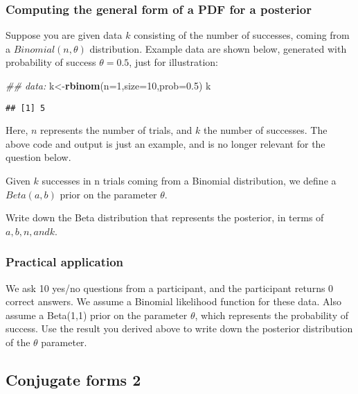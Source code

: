 \documentclass[12pt,]{krantz}
\newenvironment{Shaded}{\begin{snugshade}}{\end{snugshade}}
\newcommand{\CommentTok}[1]{\textcolor[rgb]{0.56,0.35,0.01}{\textit{#1}}}
\newcommand{\DataTypeTok}[1]{\textcolor[rgb]{0.13,0.29,0.53}{#1}}
\newcommand{\DecValTok}[1]{\textcolor[rgb]{0.00,0.00,0.81}{#1}}
\newcommand{\FloatTok}[1]{\textcolor[rgb]{0.00,0.00,0.81}{#1}}
\newcommand{\KeywordTok}[1]{\textcolor[rgb]{0.13,0.29,0.53}{\textbf{#1}}}
\newcommand{\NormalTok}[1]{#1}
\begin{document}
\hypertarget{computing-the-general-form-of-a-pdf-for-a-posterior}{%
\subsubsection{Computing the general form of a PDF for a posterior}\label{computing-the-general-form-of-a-pdf-for-a-posterior}}

Suppose you are given data \(k\) consisting of the number of successes, coming from a \(Binomial(n,\theta)\) distribution. Example data are shown below, generated with probability of success \(\theta=0.5\), just for illustration:

\begin{Shaded}
\begin{Highlighting}[]
\CommentTok{## data:}
\NormalTok{k<-}\KeywordTok{rbinom}\NormalTok{(}\DataTypeTok{n=}\DecValTok{1}\NormalTok{,}\DataTypeTok{size=}\DecValTok{10}\NormalTok{,}\DataTypeTok{prob=}\FloatTok{0.5}\NormalTok{)}
\NormalTok{k}
\end{Highlighting}
\end{Shaded}

\begin{verbatim}
## [1] 5
\end{verbatim}

Here, \(n\) represents the number of trials, and \(k\) the number of successes. The above code and output is just an example, and is no longer relevant for the question below.

Given \(k\) successes in n trials coming from a Binomial distribution, we define a \(Beta(a,b)\) prior on the parameter \(\theta\).

Write down the Beta distribution that represents the posterior, in terms of \(a,b, n, and k\).

\hypertarget{practical-application}{%
\subsubsection{Practical application}\label{practical-application}}

We ask 10 yes/no questions from a participant, and the participant returns 0 correct answers. We assume a Binomial likelihood function for these data. Also assume a Beta(1,1) prior on the parameter \(\theta\), which represents the probability of success. Use the result you derived above to write down the posterior distribution of the \(\theta\) parameter.

\hypertarget{conjugate-forms-2}{%
\subsection{Conjugate forms 2}\label{conjugate-forms-2}}
\end{document}
